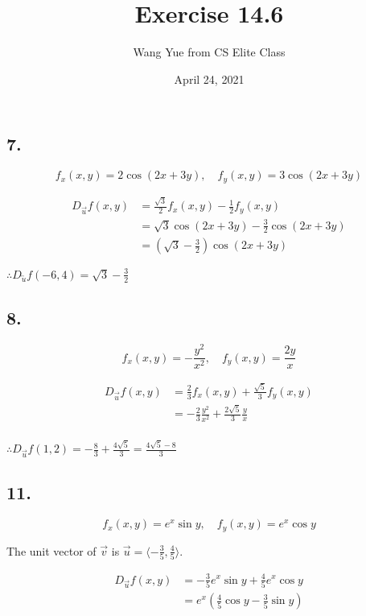 \documentclass{article}
\begin{document}
  \title{Exercise 14.6}
  \author{Wang Yue from CS Elite Class}
  \date{April 24, 2021}
  \maketitle

  \subsection*{7. }

  $$f_x(x, y) = 2\cos (2x + 3y), \quad f_y(x, y) = 3 \cos (2x + 3y)$$

  $$\begin{aligned}
    D_{\overrightarrow{u}} f(x, y) &= \frac{\sqrt{3}}{2} f_x(x, y) - \frac 1 2 f_y(x, y) \\
    &= \sqrt 3 \cos (2x + 3y) - \frac 3 2 \cos (2x + 3y) \\
    &= (\sqrt 3 - \frac 3 2)\cos (2x + 3y)
  \end{aligned}$$

  $\therefore D_{\overleftrightarrow{u}}f(-6, 4) = \sqrt 3 - \frac 3 2$

  \subsection*{8. }

  $$f_x(x, y) = -\frac{y^2}{x^2}, \quad f_y(x, y) = \frac{2y}{x}$$

  $$\begin{aligned}
    D_{\overrightarrow{u}} f(x, y) &= \frac 2 3 f_x(x, y) + \frac{\sqrt 5}{3} f_y(x, y) \\
    &= -\frac 2 3 \frac{y^2}{x^2} + \frac{2\sqrt 5}{3} \frac{y}{x} \\
  \end{aligned}$$

  $\therefore D_{\overrightarrow u}f(1, 2) = -\frac 8 3 + \frac{4\sqrt 5}{3} = \frac{4\sqrt 5 - 8}{3}$

  \subsection*{11. }

  $$f_x(x, y) = e^x \sin y, \quad f_y(x, y) = e^x \cos y$$

  The unit vector of $\overrightarrow v$ is $\overrightarrow u = \langle -\frac 3 5, \frac 4 5 \rangle$.

  $$\begin{aligned}
    D_{\overrightarrow u}f(x, y) &= -\frac 3 5 e^x \sin y + \frac 4 5 e^x \cos y \\
    &= e^x(\frac 4 5 \cos y - \frac 3 5 \sin y)
  \end{aligned}$$
\end{document}
